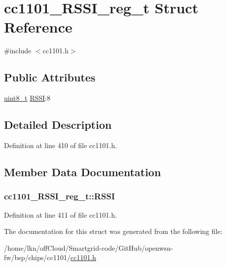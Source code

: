 \hypertarget{structcc1101___r_s_s_i__reg__t}{}\section{cc1101\+\_\+\+R\+S\+S\+I\+\_\+reg\+\_\+t Struct Reference}
\label{structcc1101___r_s_s_i__reg__t}


{\ttfamily \#include $<$cc1101.\+h$>$}

\subsection*{Public Attributes}
\begin{DoxyCompactItemize}
\item 
\hyperlink{_p_e___types_8h_aba7bc1797add20fe3efdf37ced1182c5}{uint8\+\_\+t} \hyperlink{structcc1101___r_s_s_i__reg__t_a9d53c321d91c4fb8ce1cb18832542da3}{R\+S\+SI}\+:8
\end{DoxyCompactItemize}


\subsection{Detailed Description}


Definition at line 410 of file cc1101.\+h.



\subsection{Member Data Documentation}
\subsubsection[{\texorpdfstring{R\+S\+SI}{RSSI}}]{ cc1101\+\_\+\+R\+S\+S\+I\+\_\+reg\+\_\+t\+::\+R\+S\+SI}\hypertarget{structcc1101___r_s_s_i__reg__t_a9d53c321d91c4fb8ce1cb18832542da3}{}\label{structcc1101___r_s_s_i__reg__t_a9d53c321d91c4fb8ce1cb18832542da3}


Definition at line 411 of file cc1101.\+h.



The documentation for this struct was generated from the following file\+:\begin{DoxyCompactItemize}
\item 
/home/lkn/off\+Cloud/\+Smartgrid-\/code/\+Git\+Hub/openwsn-\/fw/bsp/chips/cc1101/\hyperlink{cc1101_8h}{cc1101.\+h}\end{DoxyCompactItemize}
